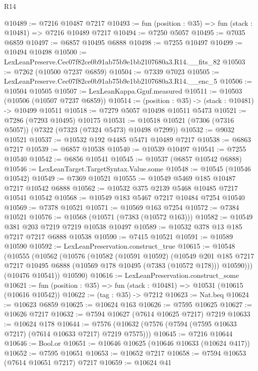 \begin{lexlean}{R14}
\begin{coremodule}
@10489 := @7216 @10487 @7217
@10493 := fun (position : @35) => fun (stack : @10481) => @7216 @10489 @7217
@10494 := @7250 @5057
@10495 := @7035 @6859
@10497 := @6857 @10495 @6888
@10498 := @7255 @10497
@10499 := @10494 @10498
@10500 := LexLeanPreserve.Cec07f82ce0b91ab75b9e1bb2107680a3.R14.__fits_82
@10503 := @7262 (@10500 @7237 @6859)
@10504 := @7339 @7023
@10505 := LexLeanPreserve.Cec07f82ce0b91ab75b9e1bb2107680a3.R14.__enc_5
@10506 := @10504 @10505
@10507 := LexLeanKappa.Gguf.measured
@10511 := @10503 (@10506 (@10507 @7237 @6859))
@10514 := (position : @35) -> (stack : @10481) -> @10499 @10511
@10518 := @7279 @5057 @10498 @10511 @5473
@10521 := @7286 (@7293 @10495) @10175
@10531 := @10518 @10521 (@7306 (@7316 @5057)) (@7322 (@7323 (@7324 @5473) @10498 @7299))
@10532 := @9032 @10521
@10537 := @10532 @192 @4485 @5471 @10489 @7217
@10538 := @6863 @7217
@10539 := @6857 @10538
@10540 := @10539 @10497
@10541 := @7255 @10540
@10542 := @6856 @10541
@10545 := @10537 (@6857 @10542 @6888)
@10546 := LexLeanTarget.TargetSyntax.Value.some
@10548 := @10545 (@10546 @10542)
@10549 := @7369 @10521
@10555 := @10549 @5469 @185 @10487 @7217 @10542 @6888
@10562 := @10532 @375 @2139 @5468 @10485 @7217 @10541 @10542
@10568 := @10549 @183 @5467 @7217 @10484 @7254 @10540
@10569 := @7378 @10521
@10571 := @10569 @163 @7254
@10572 := @7384 @10521
@10576 := @10568 (@10571 (@7383 (@10572 @163)))
@10582 := @10549 @381 @203 @7219 @7219 @10538 @10497
@10589 := @10532 @378 @13 @185 @7217 @7217 @6888 @10538
@10590 := @7415 @10521
@10591 := @10589 @10590
@10592 := LexLeanPreservation.construct_true
@10615 := @10548
    (@10555
      (@10562
        (@10576
          (@10582
            (@10591 @10592)
            (@10549
              @201
              @185
              @7217
              @7217
              @10495
              @6888
              (@10569 @178 @10495 (@7383 (@10572 @178)))
              @10590)))
        (@10476 @10541))
      @10590)
@10616 := LexLeanPreservation.construct_some
@10621 := fun (position : @35) => fun (stack : @10481) => @10531 (@10615 (@10616 @10542))
@10622 := (tag : @35) -> @7212
@10623 := Nat.beq
@10624 := @10623 @6859
@10625 := @10624 @163
@10626 := @7595 @10625
@10627 := @10626 @7217
@10632 := @7594 @10627 (@7614 @10625 @7217) @7219
@10633 := @10624 @178
@10644 := @7576 (@10632 (@7576 (@7594 (@7595 @10633 @7217) (@7614 @10633 @7217) @7219 @7575)))
@10645 := @7216 @10644
@10646 := Bool.or
@10651 := @10646 @10625 (@10646 @10633 (@10624 @417))
@10652 := @7595 @10651
@10653 := @10652 @7217
@10658 := @7594 @10653 (@7614 @10651 @7217) @7217
@10659 := @10624 @41

\end{coremodule}
\end{lexlean}
